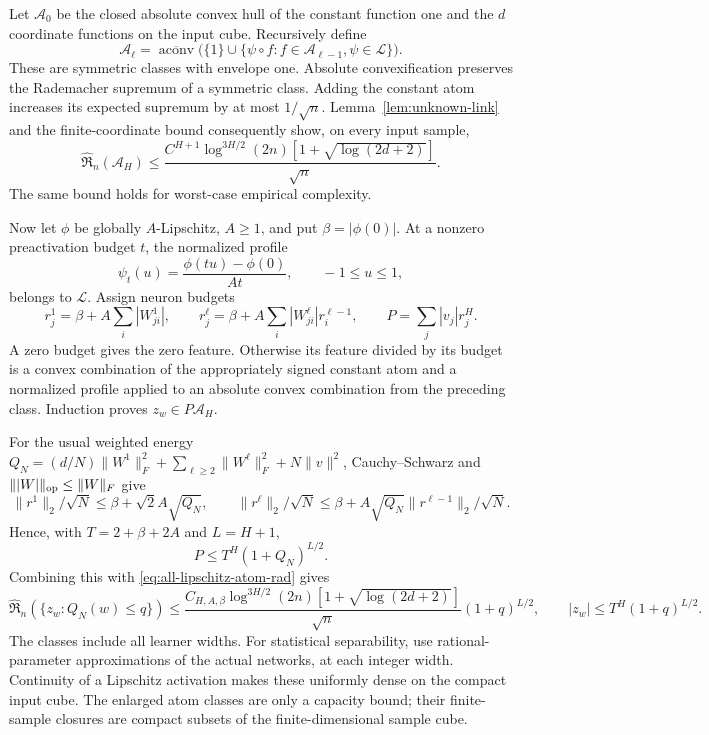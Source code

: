 Let $\mathcal A_0$ be the closed absolute convex hull of the constant
function one and the $d$ coordinate functions on the input cube.
Recursively define
\[
 \mathcal A_\ell=\overline{\operatorname{aconv}}
   \bigl(\{1\}\cup\{\psi\circ f:f\in\mathcal A_{\ell-1},
                                     \psi\in\mathcal L\}\bigr).
\]
These are symmetric classes with envelope one. Absolute convexification
preserves the Rademacher supremum of a symmetric class. Adding the
constant atom increases its expected supremum by at most $1/\sqrt n$.
Lemma~\ref{lem:unknown-link} and the finite-coordinate bound consequently
show, on every input sample,
\begin{equation}
 \widehat{\mathfrak R}_n(\mathcal A_H)
 \le \frac{C^{H+1}\log^{3H/2}(2n)
                      [1+\sqrt{\log(2d+2)}]}{\sqrt n}.
 \label{eq:all-lipschitz-atom-rad}
\end{equation}
The same bound holds for worst-case empirical complexity.

Now let $\phi$ be globally $A$-Lipschitz, $A\ge1$, and put
$\beta=|\phi(0)|$. At a nonzero preactivation budget $t$, the normalized
profile
\[
 \psi_t(u)=\frac{\phi(tu)-\phi(0)}{At},\qquad -1\le u\le1,
\]
belongs to $\mathcal L$. Assign neuron budgets
\[
 r_j^1=\beta+A\sum_i|W^1_{ji}|,\qquad
 r_j^\ell=\beta+A\sum_i|W^\ell_{ji}|r_i^{\ell-1},\qquad
 P=\sum_j|v_j|r_j^H.
\]
A zero budget gives the zero feature. Otherwise its feature divided by
its budget is a convex combination of the appropriately signed constant atom and a
normalized profile applied to an absolute convex combination from the
preceding class. Induction proves $z_w\in P\mathcal A_H$.

For the usual weighted energy
$Q_N=(d/N)\|W^1\|_F^2+\sum_{\ell\ge2}\|W^\ell\|_F^2+N\|v\|^2$,
Cauchy--Schwarz and $\||W|\|_{\rm op}\le\|W\|_F$ give
\[
 \|r^1\|_2/\sqrt N\le\beta+\sqrt2A\sqrt{Q_N},\qquad
 \|r^\ell\|_2/\sqrt N
    \le\beta+A\sqrt{Q_N}\|r^{\ell-1}\|_2/\sqrt N.
\]
Hence, with $T=2+\beta+2A$ and $L=H+1$,
\[
 P\le T^H(1+Q_N)^{L/2}.
\]
Combining this with \eqref{eq:all-lipschitz-atom-rad} gives
\begin{equation}
 \widehat{\mathfrak R}_n(\{z_w:Q_N(w)\le q\})
 \le\frac{C_{H,A,\beta}\log^{3H/2}(2n)
          [1+\sqrt{\log(2d+2)}]}{\sqrt n}(1+q)^{L/2},
 \qquad |z_w|\le T^H(1+q)^{L/2}.
 \label{eq:all-lipschitz-full-energy-rad}
\end{equation}
The classes include all learner widths. For statistical separability,
use rational-parameter approximations of the actual networks, at each
integer width. Continuity of a Lipschitz activation makes these uniformly
dense on the compact input cube. The enlarged atom classes are only a
capacity bound; their finite-sample closures are compact subsets of the
finite-dimensional sample cube.

